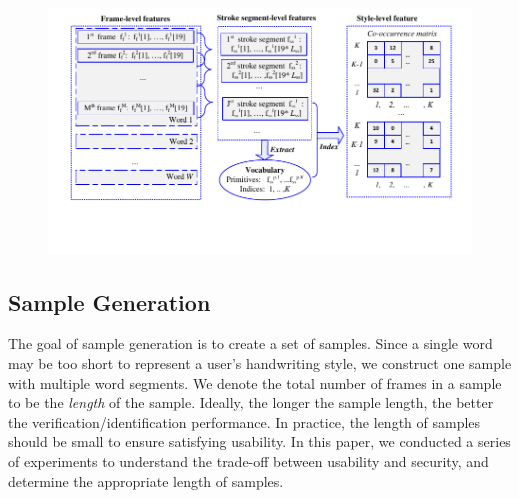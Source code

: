 \begin{figure}[!t]
\centering
\vspace{-3mm}
\includegraphics[width = 1.8\columnwidth]{./Graphic/SystemFlow/FeatureFlow_2017_Style_3.pdf}
\vspace{-22mm}
\caption{} \vspace{-0mm}
\label{fig:featureFlow}
\end{figure}



\subsection{Sample Generation}
\label{subsec:sample}

The goal of sample generation is to create a set of samples. 
Since a single word may be too short to represent a user's handwriting style, we construct one sample with multiple word segments. %
We denote the total number of frames in a sample to be the \emph{length} of the sample. Ideally, the longer the sample length, the better the verification/identification performance. 
In practice, the length of samples should be small to ensure satisfying usability. In this paper, we conducted a series of experiments to understand the trade-off between usability and security, and determine the appropriate length of samples.

